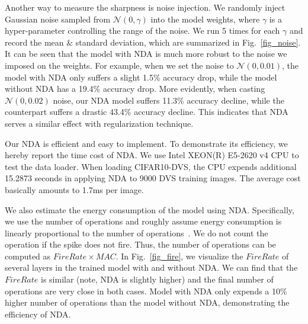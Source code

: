 \documentclass[runningheads]{llncs}
\newcommand{\bftab}{\fontseries{b}\selectfont}
\begin{document}


Another way to measure the sharpness is noise injection. We randomly inject Gaussian noise sampled from $\mathcal{N}(0, {\gamma})$ into the model weights, where $\gamma$ is a hyper-parameter controlling the range of the noise. We run 5 times for each $\gamma$ and record the mean \& standard deviation, which are summarized in Fig.~\ref{fig_noise}. It can be seen that the model with NDA is much more robust to the noise we imposed on the weights. For example, when we set the noise to $\mathcal{N}(0, 0.01)$, the model with NDA only suffers a slight 1.5\% accuracy drop, while the model without NDA has a 19.4\% accuracy drop. More evidently, when casting $\mathcal{N}(0, 0.02)$ noise, our NDA model suffers 11.3\% accuracy decline, while the counterpart suffers a drastic 43.4\% accuracy decline. This indicates that NDA serves a similar effect with regularization technique.

\noindent{\bftab Algorithm Efficiency.}
Our NDA is efficient and easy to implement. To demonstrate its efficiency, we hereby report the time cost of NDA. We use Intel XEON(R) E5-2620 v4 CPU to test the data loader. When loading CIFAR10-DVS, the CPU expends additional 15.2873 seconds in applying NDA to 9000 DVS training images. The average cost basically amounts to 1.7ms per image. 

We also estimate the energy consumption of the model using NDA. Specifically, we use the number of operations and roughly assume energy consumption is linearly proportional to the number of operations~\cite{rathi2020diet,zheng2020going}. We do not count the operation if the spike does not fire. Thus, the number of operations can be computed as $FireRate \times MAC$. In Fig.~\ref{fig_fire}, we visualize the $Fire Rate$ of several layers in the trained model with and without NDA. We can find that the $Fire Rate$ is similar (note, NDA is slightly higher) and the final number of operations are very close in both cases. Model with NDA only expends a 10\% higher number of operations than the model without NDA, demonstrating the efficiency of NDA. 
\end{document}
